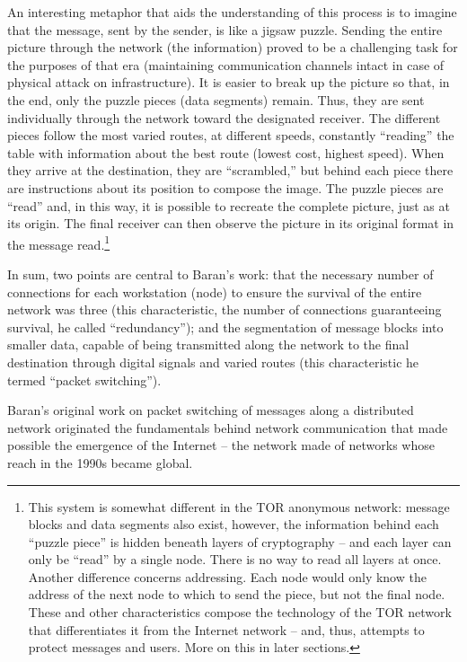 An interesting metaphor that aids the understanding of this process is to imagine that the message, sent by the sender, is like a jigsaw puzzle. Sending the entire picture through the network (the information) proved to be a challenging task for the purposes of that era (maintaining communication channels intact in case of physical attack on infrastructure). It is easier to break up the picture so that, in the end, only the puzzle pieces (data segments) remain. Thus, they are sent individually through the network toward the designated receiver. The different pieces follow the most varied routes, at different speeds, constantly ``reading'' the table with information about the best route (lowest cost, highest speed). When they arrive at the destination, they are ``scrambled,'' but behind each piece there are instructions about its position to compose the image. The puzzle pieces are ``read'' and, in this way, it is possible to recreate the complete picture, just as at its origin. The final receiver can then observe the picture in its original format in the message read.\footnote{This system is somewhat different in the TOR anonymous network: message blocks and data segments also exist, however, the information behind each ``puzzle piece'' is hidden beneath layers of cryptography -- and each layer can only be ``read'' by a single node. There is no way to read all layers at once. Another difference concerns addressing. Each node would only know the address of the next node to which to send the piece, but not the final node. These and other characteristics compose the technology of the TOR network that differentiates it from the Internet network -- and, thus, attempts to protect messages and users. More on this in later sections.}

In sum, two points are central to Baran's work: that the necessary number of connections for each workstation (node) to ensure the survival of the entire network was three (this characteristic, the number of connections guaranteeing survival, he called ``redundancy''); and the segmentation of message blocks into smaller data, capable of being transmitted along the network to the final destination through digital signals and varied routes (this characteristic he termed ``packet switching'').

Baran's original work on packet switching of messages along a distributed network originated the fundamentals behind network communication that made possible the emergence of the Internet -- the network made of networks whose reach in the 1990s became global.

